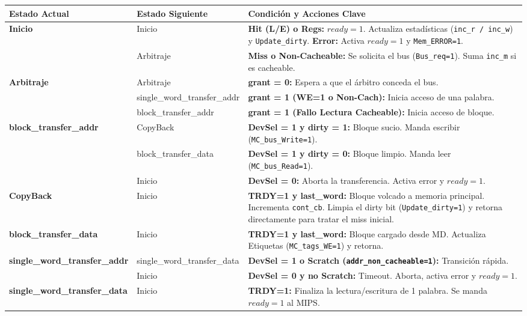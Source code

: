 \documentclass[12pt,a4paper]{article}
\begin{document}
    \begin{table}[H]
    \centering
    \footnotesize
    \renewcommand{\arraystretch}{1.3}
    \begin{tabularx}{\textwidth}{@{} l l X @{}}
    \toprule
    \textbf{Estado Actual} & \textbf{Estado Siguiente} & \textbf{Condición y Acciones Clave} \\
    \midrule
    \textbf{Inicio} & Inicio & \textbf{Hit (L/E) o Regs:} $ready=1$. Actualiza estadísticas (\texttt{inc\_r / inc\_w}) y \texttt{Update\_dirty}. \textbf{Error:} Activa $ready=1$ y \texttt{Mem\_ERROR=1}. \\
                    & Arbitraje & \textbf{Miss o Non-Cacheable:} Se solicita el bus (\texttt{Bus\_req=1}). Suma \texttt{inc\_m} si es cacheable. \\
    \midrule
    \textbf{Arbitraje} & Arbitraje & \textbf{grant = 0:} Espera a que el árbitro conceda el bus. \\
                        & single\_word\_transfer\_addr & \textbf{grant = 1 (WE=1 o Non-Cach):} Inicia acceso de una palabra. \\
                        & block\_transfer\_addr & \textbf{grant = 1 (Fallo Lectura Cacheable):} Inicia acceso de bloque. \\
    \midrule
    \textbf{block\_transfer\_addr} & CopyBack & \textbf{DevSel = 1 y dirty = 1:} Bloque sucio. Manda escribir (\texttt{MC\_bus\_Write=1}). \\
                                & block\_transfer\_data & \textbf{DevSel = 1 y dirty = 0:} Bloque limpio. Manda leer (\texttt{MC\_bus\_Read=1}). \\
                                & Inicio & \textbf{DevSel = 0:} Aborta la transferencia. Activa error y $ready=1$. \\
    \midrule
    \textbf{CopyBack} & Inicio & \textbf{TRDY=1 y last\_word:} Bloque volcado a memoria principal. Incrementa \texttt{cont\_cb}. Limpia el dirty bit (\texttt{Update\_dirty=1}) y retorna directamente para tratar el miss inicial. \\
    \midrule
    \textbf{block\_transfer\_data} & Inicio & \textbf{TRDY=1 y last\_word:} Bloque cargado desde MD. Actualiza Etiquetas (\texttt{MC\_tags\_WE=1}) y retorna. \\
    \midrule
    \textbf{single\_word\_transfer\_addr} & single\_word\_transfer\_data & \textbf{DevSel = 1 o Scratch (\texttt{addr\_non\_cacheable=1}):} Transición rápida. \\
                                        & Inicio & \textbf{DevSel = 0 y no Scratch:} Timeout. Aborta, activa error y $ready=1$. \\
    \midrule
    \textbf{single\_word\_transfer\_data} & Inicio & \textbf{TRDY=1:} Finaliza la lectura/escritura de 1 palabra. Se manda $ready=1$ al MIPS. \\
    \bottomrule
    \end{tabularx}
    \end{table}
\end{document}
